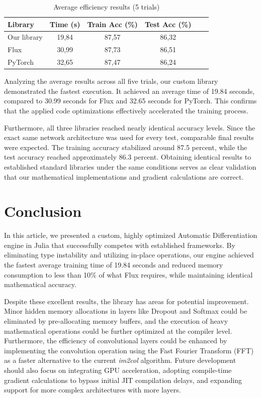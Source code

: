 \documentclass[conference]{IEEEtran}
\begin{document}
\begin{table}[htbp]
\centering
\caption{Average efficiency results (5 trials)}
\label{tab:average_efficiency}
\begin{tabular}{|l|c|c|c|c|c|}
\hline
\textbf{Library} & \textbf{Time (s)} & \textbf{Train Acc (\%)} & \textbf{Test Acc (\%)} \\ \hline
Our library & 19,84 & 87,57 & 86,32 \\ \hline
Flux & 30,99 & 87,73 & 86,51 \\ \hline
PyTorch & 32,65 & 87,47 & 86,24 \\ \hline
\end{tabular}
\end{table}

Analyzing the average results across all five trials, our custom library demonstrated the fastest execution. It achieved an average time of 19.84 seconds, compared to 30.99 seconds for Flux and 32.65 seconds for PyTorch. This confirms that the applied code optimizations effectively accelerated the training process.

Furthermore, all three libraries reached nearly identical accuracy levels. Since the exact same network architecture was used for every test, comparable final results were expected. The training accuracy stabilized around 87.5 percent, while the test accuracy reached approximately 86.3 percent. Obtaining identical results to established standard libraries under the same conditions serves as clear validation that our mathematical implementations and gradient calculations are correct.

\section{Conclusion}
In this article, we presented a custom, highly optimized Automatic Differentiation engine in Julia that successfully competes with established frameworks. By eliminating type instability and utilizing in-place operations, our engine achieved the fastest average training time of 19.84 seconds and reduced memory consumption to less than 10\% of what Flux requires, while maintaining identical mathematical accuracy. 

Despite these excellent results, the library has areas for potential improvement. Minor hidden memory allocations in layers like Dropout and Softmax could be eliminated by pre-allocating memory buffers, and the execution of heavy mathematical operations could be further optimized at the compiler level. Furthermore, the efficiency of convolutional layers could be enhanced by implementing the convolution operation using the Fast Fourier Transform (FFT) as a faster alternative to the current \textit{im2col} algorithm. Future development should also focus on integrating GPU acceleration, adopting compile-time gradient calculations to bypass initial JIT compilation delays, and expanding support for more complex architectures with more layers.
\end{document}

